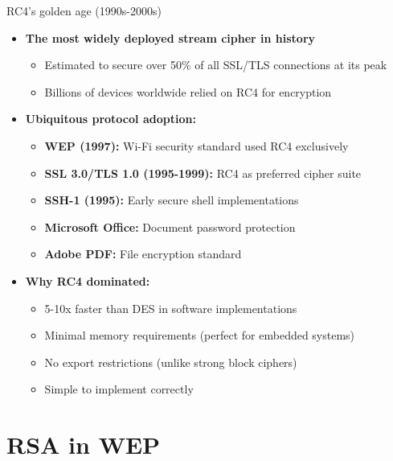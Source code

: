 \documentclass[aspectratio=169, lualatex, handout]{beamer}
\begin{document}
\begin{frame}{RC4's golden age (1990s-2000s)}
	\begin{itemize}[<+->]
		\item \textbf{The most widely deployed stream cipher in history}
		      \begin{itemize}[<+->]
			      \item Estimated to secure over 50\% of all SSL/TLS connections at its peak
			      \item Billions of devices worldwide relied on RC4 for encryption
		      \end{itemize}
		\item \textbf{Ubiquitous protocol adoption:}
		      \begin{itemize}[<+->]
			      \item \textbf{WEP (1997):} Wi-Fi security standard used RC4 exclusively
			      \item \textbf{SSL 3.0/TLS 1.0 (1995-1999):} RC4 as preferred cipher suite
			      \item \textbf{SSH-1 (1995):} Early secure shell implementations
			      \item \textbf{Microsoft Office:} Document password protection
			      \item \textbf{Adobe PDF:} File encryption standard
		      \end{itemize}
		\item \textbf{Why RC4 dominated:}
		      \begin{itemize}[<+->]
			      \item 5-10x faster than DES in software implementations
			      \item Minimal memory requirements (perfect for embedded systems)
			      \item No export restrictions (unlike strong block ciphers)
			      \item Simple to implement correctly
		      \end{itemize}
	\end{itemize}
\end{frame}

\section{RSA in WEP}
\end{document}
